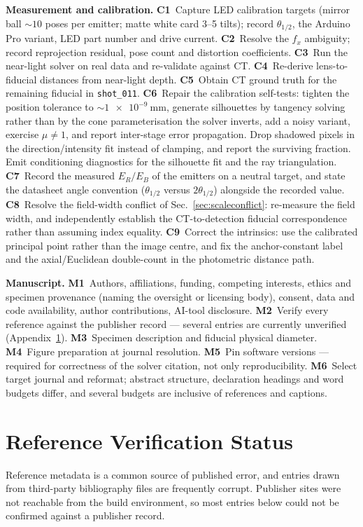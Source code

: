 \documentclass[journal,10pt]{IEEEtran}
\begin{document}
\textbf{Measurement and calibration.}
\textbf{C1}~Capture LED calibration targets (mirror ball ${\sim}10$ poses per
emitter; matte white card \numrange{3}{5} tilts); record $\theta_{1/2}$, the
Arduino Pro variant, LED part number and drive current.
\textbf{C2}~Resolve the $f_x$ ambiguity; record reprojection residual, pose count
and distortion coefficients.
\textbf{C3}~Run the near-light solver on real data and re-validate against CT.
\textbf{C4}~Re-derive lens-to-fiducial distances from near-light depth.
\textbf{C5}~Obtain CT ground truth for the remaining fiducial in
\texttt{shot\_011}.
\textbf{C6}~Repair the calibration self-tests: tighten the position tolerance to
${\sim}\SI{1e-9}{\milli\metre}$, generate silhouettes by tangency solving rather
than by the cone parameterisation the solver inverts, add a noisy variant,
exercise $\mu\neq1$, and report inter-stage error propagation. Drop shadowed
pixels in the direction/intensity fit instead of clamping, and report the
surviving fraction. Emit conditioning diagnostics for the silhouette fit and the
ray triangulation.
\textbf{C7}~Record the measured $E_R/E_B$ of the emitters on a neutral target,
and state the datasheet angle convention ($\theta_{1/2}$ versus
$2\theta_{1/2}$) alongside the recorded value.
\textbf{C8}~Resolve the field-width conflict of Sec.~\ref{sec:scaleconflict}:
re-measure the field width, and independently establish the CT-to-detection
fiducial correspondence rather than assuming index equality.
\textbf{C9}~Correct the intrinsics: use the calibrated principal point rather
than the image centre, and fix the anchor-constant label and the axial/Euclidean
double-count in the photometric distance path.

\textbf{Manuscript.}
\textbf{M1}~Authors, affiliations, funding, competing interests, ethics and
specimen provenance (naming the oversight or licensing body), consent, data and
code availability, author contributions, AI-tool disclosure.
\textbf{M2}~Verify every reference against the publisher record --- several
entries are currently unverified (Appendix~\ref{app:refs}).
\textbf{M3}~Specimen description and fiducial physical diameter.
\textbf{M4}~Figure preparation at journal resolution.
\textbf{M5}~Pin software versions --- required for correctness of the solver
citation, not only reproducibility.
\textbf{M6}~Select target journal and reformat; abstract structure, declaration
headings and word budgets differ, and several budgets are inclusive of references
and captions.

\section{Reference Verification Status}\label{app:refs}
\footnotesize
Reference metadata is a common source of published error, and entries drawn from
third-party bibliography files are frequently corrupt. Publisher sites were not
reachable from the build environment, so most entries below could not be
confirmed against a publisher record.
\end{document}
